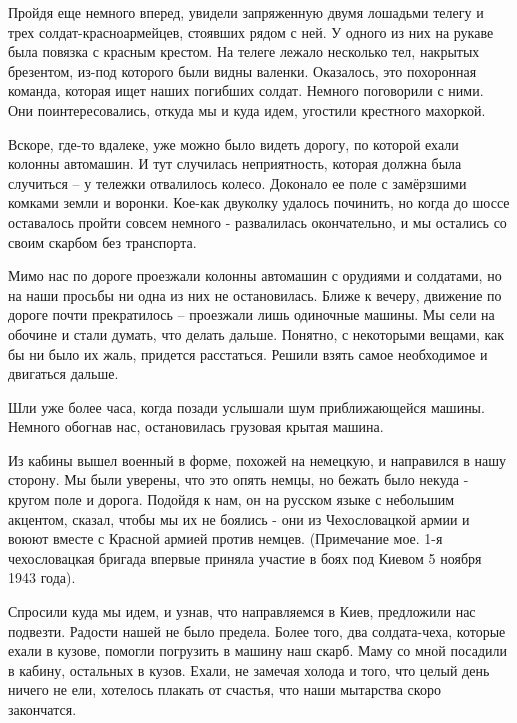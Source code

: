 
Пройдя еще немного вперед, увидели запряженную двумя лошадьми телегу и трех
солдат-красноармейцев, стоявших рядом с ней. У одного из них на рукаве была
повязка с красным крестом. На телеге лежало несколько тел, накрытых брезентом,
из-под которого были видны валенки. Оказалось, это похоронная команда, которая
ищет наших погибших солдат. Немного поговорили с ними. Они поинтересовались,
откуда мы и куда идем, угостили крестного махоркой.

Вскоре, где-то вдалеке, уже можно было видеть дорогу, по которой ехали колонны
автомашин. И тут случилась неприятность, которая должна была случиться – у
тележки отвалилось колесо. Доконало ее поле с замёрзшими комками земли и
воронки. Кое-как двуколку удалось починить, но когда до шоссе оставалось пройти
совсем немного - развалилась окончательно, и мы остались со своим скарбом без
транспорта. 

Мимо нас по дороге проезжали колонны автомашин с орудиями и
солдатами, но на наши просьбы ни одна из них не остановилась. Ближе к вечеру,
движение по дороге почти прекратилось – проезжали лишь одиночные машины. Мы
сели на обочине и стали думать, что делать дальше. Понятно, с некоторыми
вещами, как бы ни было их жаль, придется расстаться. Решили взять самое
необходимое и двигаться дальше. 

Шли уже более часа, когда позади услышали шум
приближающейся машины. Немного обогнав нас, остановилась грузовая крытая
машина. 


Из кабины вышел военный в форме, похожей на немецкую, и направился в
нашу сторону. Мы были уверены, что это опять немцы, но бежать было некуда -
кругом поле и дорога. Подойдя к нам, он на русском языке с небольшим акцентом,
сказал, чтобы мы их не боялись - они из Чехословацкой армии и воюют вместе с
Красной армией против немцев. (Примечание мое. 1-я чехословацкая бригада
впервые приняла участие в боях под Киевом 5 ноября 1943 года). 

Спросили куда мы
идем, и узнав, что направляемся в Киев, предложили нас подвезти. Радости нашей
не было предела. Более того, два солдата-чеха, которые ехали в кузове, помогли
погрузить в машину наш скарб. Маму со мной посадили в кабину, остальных в
кузов. Ехали, не замечая холода и того, что целый день ничего не ели, хотелось
плакать от счастья, что наши мытарства скоро закончатся.


